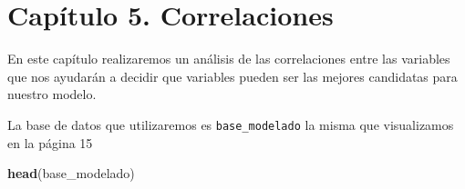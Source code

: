 \documentclass[
  11pt,
  a4paper,
]{book}
\newenvironment{Shaded}{\begin{snugshade}}{\end{snugshade}}
\newcommand{\KeywordTok}[1]{\textcolor[rgb]{0.13,0.29,0.53}{\textbf{#1}}}
\newcommand{\NormalTok}[1]{#1}
\begin{document}
\hypertarget{capuxedtulo-5.-correlaciones}{%
\chapter{Capítulo 5. Correlaciones}\label{capuxedtulo-5.-correlaciones}}

En este capítulo realizaremos un análisis de las correlaciones entre las
variables que nos ayudarán a decidir que variables pueden ser las
mejores candidatas para nuestro modelo.

La base de datos que utilizaremos es \texttt{base\_modelado} la misma
que visualizamos en la página 15

\begin{Shaded}
\begin{Highlighting}[]
\KeywordTok{head}\NormalTok{(base_modelado)}
\end{Highlighting}
\end{Shaded}
\end{document}
